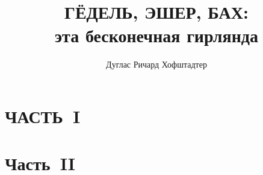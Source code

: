 \documentclass[a4paper,12pt,oneside,openany]{memoir}
\title{ГЁДЕЛЬ, ЭШЕР, БАХ: \\ эта бесконечная гирлянда}
\author{Дуглас Ричард Хофштадтер}
\begin{document}
\frontmatter

\maketitle

\mainmatter



\begingroup
\hypersetup{hidelinks}
\clearpage
\tableofcontents
\clearpage
\endgroup





\part{ЧАСТЬ~I}



\clearpage

\clearpage

\clearpage

\clearpage

\clearpage

\clearpage

\clearpage

\clearpage

\clearpage


\part{Часть~II}


\clearpage

\end{document}
